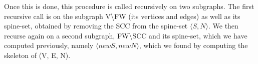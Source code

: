\documentclass[../master/master.tex]{subfiles}
\newcommand{\pair}[2]{\ensuremath{\langle #1, #2\rangle}}
\begin{document}
Once this is done, this procedure is called recursively on two subgraphs. The first recursive call is on the subgraph V\textbackslash FW (its vertices and edges) as well as its spine-set, obtained by removing the SCC from the spine-set \pair{S}{N}. We then recurse again on a second subgraph, FW\textbackslash SCC and its spine-set, which we have computed previously, namely \pair{newS}{newN}, which we found by computing the skeleton of (V, E, N).

\end{document}
